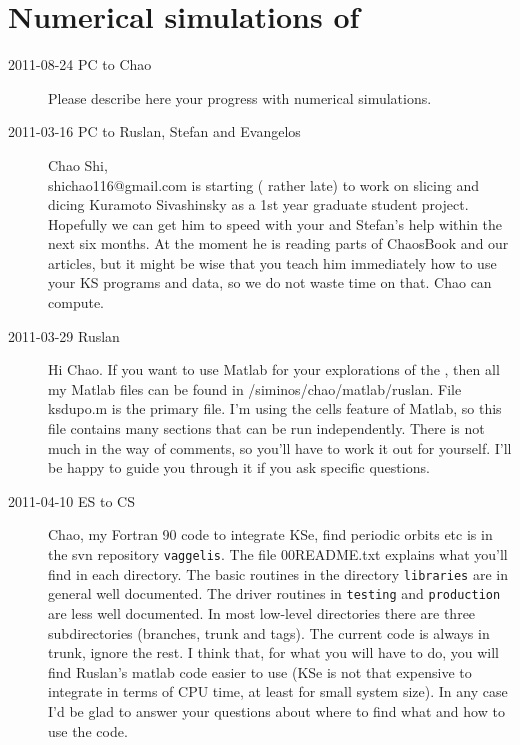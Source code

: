 \section{Numerical simulations of \KSe}
\label{s:KSnumerical}

\begin{description}

\item[2011-08-24 PC to Chao]
Please describe here your progress with numerical simulations.

\item[2011-03-16 PC to Ruslan, Stefan and Evangelos]
   Chao Shi,
\\ shichao116@gmail.com is starting ( rather late) to work on
   slicing and dicing Kuramoto Sivashinsky as a 1st year graduate student
   project. Hopefully we can get him to speed with your and Stefan's help
   within the next six months. At the moment he is reading parts of
   ChaosBook and our articles, but it might be wise that you teach him
   immediately how to use your KS programs and data, so we do not waste
   time on that. Chao can compute.

\item[2011-03-29 Ruslan]
Hi Chao.  If you want to use Matlab for your explorations of the \KS,
then all my Matlab files can be found in /siminos/chao/matlab/ruslan.
File ksdupo.m is the primary file.  I'm using the cells feature of
Matlab, so this file contains many sections that can be run
independently.  There is not much in the way of comments, so you'll have
to work it out for yourself.  I'll be happy to guide you through it if
you ask specific questions.

\item[2011-04-10 ES to CS] Chao, my Fortran 90 code to integrate KSe, find
periodic orbits etc is in the svn repository \texttt{vaggelis}. The file 00README.txt
explains what you'll find in each directory. The basic routines in the
directory \texttt{libraries} are in general well documented. The driver routines in
\texttt{testing} and \texttt{production} are less well documented. In most
low-level directories there are three subdirectories (branches, trunk and tags).
The current code is always in trunk, ignore the rest. I think that, for what you
will have to do, you will find Ruslan's matlab code easier to use (KSe is not that
expensive to integrate in terms of CPU time, at least for small system size). In any
case I'd be glad to answer your questions about where to find what and how to
use the code.


\end{description}
